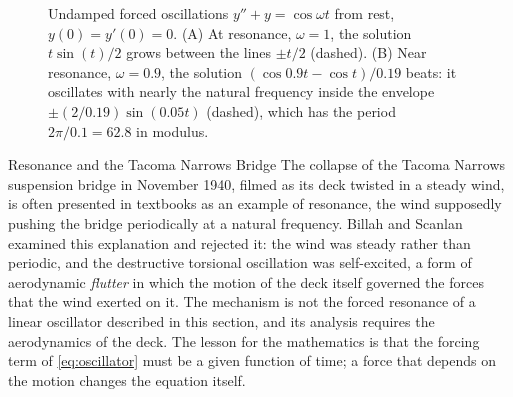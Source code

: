 \begin{figure}
\hfill
{}
\caption{Undamped forced oscillations $y''+y=\cos\omega t$ from rest, $y(0)=y'(0)=0$. (A) At resonance, $\omega=1$, the solution $t\sin(t)/2$ grows between the lines $\pm t/2$ (dashed). (B) Near resonance, $\omega=0.9$, the solution $(\cos0.9t-\cos t)/0.19$ beats: it oscillates with nearly the natural frequency inside the envelope $\pm(2/0.19)\sin(0.05t)$ (dashed), which has the period $2\pi/0.1=62.8$ in modulus.\label{fig:resonance}}
\end{figure}

\begin{note}{Resonance and the Tacoma Narrows Bridge}
The collapse of the Tacoma Narrows suspension bridge in November 1940, filmed as its deck twisted in a steady wind, is often presented in textbooks as an example of resonance, the wind supposedly pushing the bridge periodically at a natural frequency. Billah and Scanlan~\cite{billah1991} examined this explanation and rejected it: the wind was steady rather than periodic, and the destructive torsional oscillation was self-excited, a form of aerodynamic \emph{flutter} in which the motion of the deck itself governed the forces that the wind exerted on it. The mechanism is not the forced resonance of a linear oscillator described in this section, and its analysis requires the aerodynamics of the deck. The lesson for the mathematics is that the forcing term of \eqref{eq:oscillator} must be a given function of time; a force that depends on the motion changes the equation itself.
\end{note}

